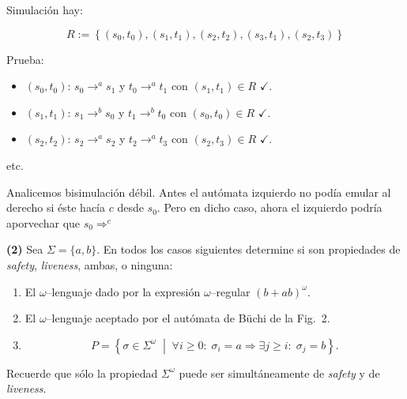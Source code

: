 \documentclass[a4paper, 12pt]{article}
\begin{document}
Simulación hay: 

\begin{equation*}
    R := \left\{ (s_0, t_0), (s_1, t_1), (s_2, t_2), (s_3, t_1), (s_2, t_3) \right\} 
\end{equation*}

Prueba:
 
\begin{itemize}
    \item $(s_0, t_0)$:  $s_0 \to^a s_1$ y $t_0 \to^a t_1$ con $(s_1, t_1) \in
        R$ $\checkmark$.
    \item $(s_{1}, t_1)$: $s_1 \to^b s_0$ y $t_1 \to^b t_0$ con $(s_0, t_0) \in R$
        $\checkmark$.
    \item $(s_2, t_2)$: $s_2 \to^a s_2$ y $t_2 \to^a t_3$ con $(s_2, t_3) \in R$
        $\checkmark$.
\end{itemize}

etc.

Analicemos bisimulación débil. Antes el autómata izquierdo no podía emular al
derecho si éste hacía $c$ desde $s_0$. Pero en dicho caso, ahora el izquierdo
podría aporvechar que $s_0 \Rightarrow^c$

\pagebreak 

\begin{myframe}
    \textbf{(2)} Sea $\Sigma = \{a,b\}$. En todos los casos siguientes determine si son
propiedades de \emph{safety}, \emph{liveness}, ambas, o ninguna:

\begin{enumerate}
    \item[(a)] El $\omega$--lenguaje dado por la expresión $\omega$--regular
    $(b + ab)^\omega$.

    \item[(b)] El $\omega$--lenguaje aceptado por el autómata de Büchi de la
    Fig.~2.

    \item[(c)] 
    \[
        P = \left\{
        \sigma \in \Sigma^\omega
        \;\middle|\;
        \forall i \geq 0:\;
        \sigma_i = a \Rightarrow \exists j \geq i:\; \sigma_j = b
        \right\}.
    \]
\end{enumerate}

Recuerde que sólo la propiedad $\Sigma^\omega$ puede ser simultáneamente de
\emph{safety} y de \emph{liveness}.
\end{myframe}
\end{document}
